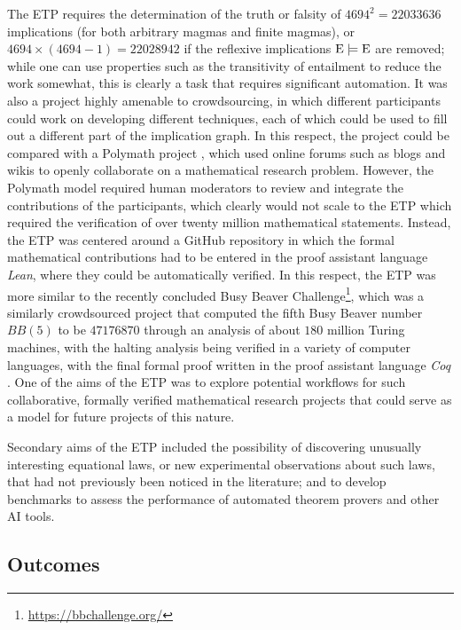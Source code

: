 The ETP requires the determination of the truth or falsity of $\num{4694}^2 = \num{22033636}$ implications (for both arbitrary magmas and finite magmas), or $\num{4694} \times (\num{4694}-1) = \num{22028942}$ if the reflexive implications ${\mathrm{E}} \models \mathrm{E}$ are removed; while one can use properties such as the transitivity of entailment to reduce the work somewhat, this is clearly a task that requires significant automation. It was also a project highly amenable to crowdsourcing, in which different participants could work on developing different techniques, each of which could be used to fill out a different part of the implication graph. In this respect, the project could be compared with a Polymath project \cite{Gowers2009}, which used online forums such as blogs and wikis to openly collaborate on a mathematical research problem. However, the Polymath model required human moderators to review and integrate the contributions of the participants, which clearly would not scale to the ETP which required the verification of over twenty million mathematical statements. Instead, the ETP was centered around a GitHub repository in which the formal mathematical contributions had to be entered in the proof assistant language \emph{Lean}, where they could be automatically verified. In this respect, the ETP was more similar to the recently concluded Busy Beaver Challenge\footnote{\url{https://bbchallenge.org/}}, which was a similarly crowdsourced project that computed the fifth Busy Beaver number $BB(5)$ to be $\num{47176870}$ through an analysis of about $180$ million Turing machines, with the halting analysis being verified in a variety of computer languages, with the final formal proof written in the proof assistant language \emph{Coq} \cite{the_coq_development_team_2024_14542673, bbchallenge_bb5}. One of the aims of the ETP was to explore potential workflows for such collaborative, formally verified mathematical research projects that could serve as a model for future projects of this nature.

Secondary aims of the ETP included the possibility of discovering unusually interesting equational laws, or new experimental observations about such laws, that had not previously been noticed in the literature; and to develop benchmarks to assess the performance of automated theorem provers and other AI tools.

\subsection{Outcomes}

